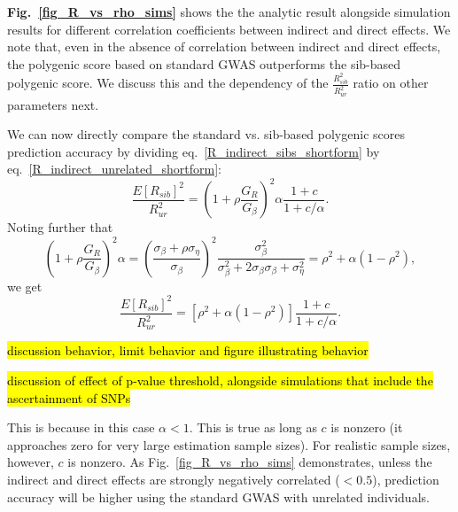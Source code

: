 \documentclass[hidelinks, 12pt]{article}
\begin{document}
{\bf Fig.~\ref{fig_R_vs_rho_sims}} shows the the analytic result alongside simulation results for different correlation coefficients between indirect and direct effects.  We note that, even in the absence of correlation between indirect and direct effects, the polygenic score based on standard GWAS outperforms the sib-based polygenic score.  We discuss this and the dependency of the $\frac{R_{sib}^2}{R_{ur}^2}$ ratio on other parameters next.

We can now directly compare the standard vs. sib-based polygenic scores prediction accuracy by dividing eq.~\ref{R_indirect_sibs_shortform} by eq.~\ref{R_indirect_unrelated_shortform}:
$$\frac{E[R_{sib}]^2}{R_{ur}^2}=\left(1+\rho \frac{G_{R}}{G_{\beta}}\right)^{2}\alpha \frac{1+c}{1+c/\alpha}.$$
Noting further that
$$\left(1+\rho \frac{G_{R}}{G_{\beta}}\right)^{2} \alpha=\left(\frac{\sigma_\beta+\rho \sigma_\eta}{\sigma_\beta}\right)^{2} \frac{\sigma_\beta^{2}}{\sigma_\beta^{2}+2 \sigma_{\beta} \sigma_{\beta}+\sigma_{\eta}^{2}}=\rho^2 + \alpha (1-\rho^2),$$
we get
\begin{equation}
\label{R2_ratio}
\frac{E[R_{sib}]^2}{R_{ur}^2}=[\rho^2 + \alpha (1-\rho^2)]\frac{1+c}{1+c/\alpha}.
\end{equation}

\hl{discussion behavior, limit behavior and figure illustrating behavior}

\hl{discussion of effect of p-value threshold, alongside simulations that include the ascertainment of SNPs}

\vspace{0.5cm}

This is because in this case $\alpha < 1$.  This is true as long as $c$ is nonzero (it approaches zero for very large estimation sample sizes). For realistic sample sizes, however, $c$ is nonzero.  As Fig.~\ref{fig_R_vs_rho_sims} demonstrates, unless the indirect and direct effects are strongly negatively correlated ($<0.5$), prediction accuracy will be higher using the standard GWAS with unrelated individuals.\\
\end{document}
